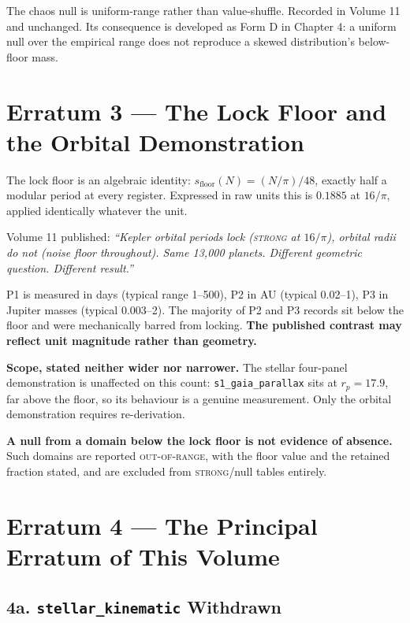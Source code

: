 \documentclass[11pt, letterpaper, openany]{book}
\begin{document}
The chaos null is uniform-range rather than value-shuffle. Recorded in Volume 11 and unchanged.
Its consequence is developed as Form D in Chapter 4: a uniform null over the empirical range
does not reproduce a skewed distribution's below-floor mass.

\section{Erratum 3 --- The Lock Floor and the Orbital Demonstration}

\begin{erratumbox}
The lock floor is an algebraic identity: $s_{\text{floor}}(N) = (N/\pi)/48$, exactly half a
modular period at every register. Expressed in raw units this is $0.1885$ at $16/\pi$, applied
identically whatever the unit.

\medskip
Volume 11 published: \emph{``Kepler orbital periods lock (\textsc{strong} at $16/\pi$), orbital
radii do not (noise floor throughout). Same 13{,}000 planets. Different geometric question.
Different result.''}

\medskip
P1 is measured in days (typical range 1--500), P2 in AU (typical 0.02--1), P3 in Jupiter masses
(typical 0.003--2). The majority of P2 and P3 records sit below the floor and were mechanically
barred from locking. \textbf{The published contrast may reflect unit magnitude rather than
geometry.}
\end{erratumbox}

\textbf{Scope, stated neither wider nor narrower.} The stellar four-panel demonstration is
unaffected on this count: \texttt{s1\_gaia\_parallax} sits at $r_p = 17.9$, far above the floor,
so its behaviour is a genuine measurement. Only the orbital demonstration requires
re-derivation.

\begin{signalbox}
\textbf{A null from a domain below the lock floor is not evidence of absence.} Such domains are
reported \textsc{out-of-range}, with the floor value and the retained fraction stated, and are
excluded from \textsc{strong}/null tables entirely.
\end{signalbox}

\section{Erratum 4 --- The Principal Erratum of This Volume}

\subsection{4a. \texttt{stellar\_kinematic} Withdrawn}
\end{document}

